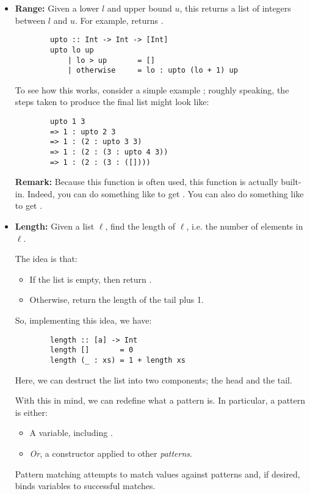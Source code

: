 \documentclass[letterpaper]{article}
\begin{document}
\begin{itemize}
    \item \textbf{Range:} Given a lower $l$ and upper bound $u$, this returns a list of integers between $l$ and $u$. For example,  returns \code{[1, 2, 3]}. 
    \begin{verbatim}
        upto :: Int -> Int -> [Int]
        upto lo up 
            | lo > up       = [] 
            | otherwise     = lo : upto (lo + 1) up \end{verbatim}
    To see how this works, consider a simple example ; roughly speaking, the steps taken to produce the final list might look like: 
    \begin{verbatim}
        upto 1 3
        => 1 : upto 2 3
        => 1 : (2 : upto 3 3)
        => 1 : (2 : (3 : upto 4 3))
        => 1 : (2 : (3 : ([])))\end{verbatim}
    \textbf{Remark:} Because this function is often used, this function is actually built-in. Indeed, you can do something like \code{[1..10]} to get \code{[1, 2, 3, 4, 5, 6, 7, 8, 9, 10]}. You can also do something like \code{[1,3..10]} to get \code{[1, 3, 5, 7, 9]}.

    \item \textbf{Length:} Given a list $\ell$, find the length of $\ell$, i.e. the number of elements in $\ell$.
    
    \bigskip 

    The idea is that: 
    \begin{itemize}
        \item If the list is empty, then return .
        \item Otherwise, return the length of the tail plus 1. 
    \end{itemize}
    So, implementing this idea, we have: 
    \begin{verbatim}
        length :: [a] -> Int 
        length []       = 0
        length (_ : xs) = 1 + length xs \end{verbatim}
    Here, we can destruct the list into two components; the head and the tail. 

    \bigskip 

    With this in mind, we can redefine what a pattern is. In particular, a pattern is either: 
    \begin{itemize}
        \item A variable, including \code{\_}.
        \item \emph{Or}, a constructor applied to other \emph{patterns}.
    \end{itemize}
    Pattern matching attempts to match values against patterns and, if desired, binds variables to successful matches.


\end{itemize}
\end{document}
